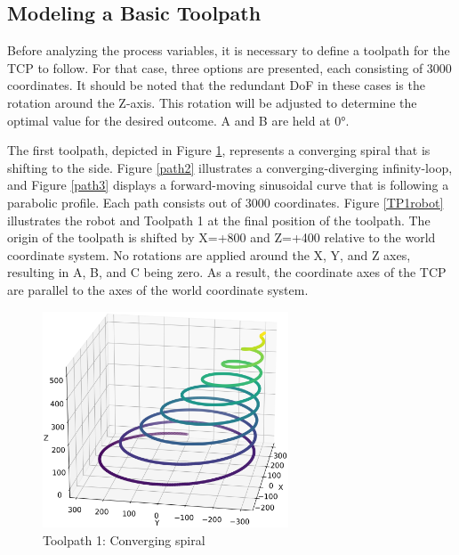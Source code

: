 \subsection{Modeling a Basic Toolpath}\label{MBT}
Before analyzing the process variables, it is necessary to define a toolpath for the \acrshort{TCP} to follow. For that case, three options are presented, each consisting of 3000 coordinates. It should be noted that the redundant \acrshort{DoF} in these cases is the rotation around the Z-axis. This rotation will be adjusted to determine the optimal value for the desired outcome. A and B are held at 0°.

The first toolpath, depicted in Figure \ref{path1}, represents a converging spiral that is shifting to the side. Figure \ref{path2} illustrates a converging-diverging infinity-loop, and Figure \ref{path3} displays a forward-moving sinusoidal curve that is following a parabolic profile. Each path consists out of 3000 coordinates. %
\newpage
Figure \ref{TP1robot} illustrates the robot and Toolpath 1 at the final position of the toolpath. The origin of the toolpath is shifted by X=+800 and Z=+400 relative to the world coordinate system. No rotations are applied around the X, Y, and Z axes, resulting in A, B, and C being zero. As a result, the coordinate axes of the \acrshort{TCP} are parallel to the axes of the world coordinate system.

\begin{figure}[H]%
	\centering
	\includegraphics[width=0.65\textwidth]{figures/path1.png}
	\caption{Toolpath 1: Converging spiral}
	\label{path1}
\end{figure}

